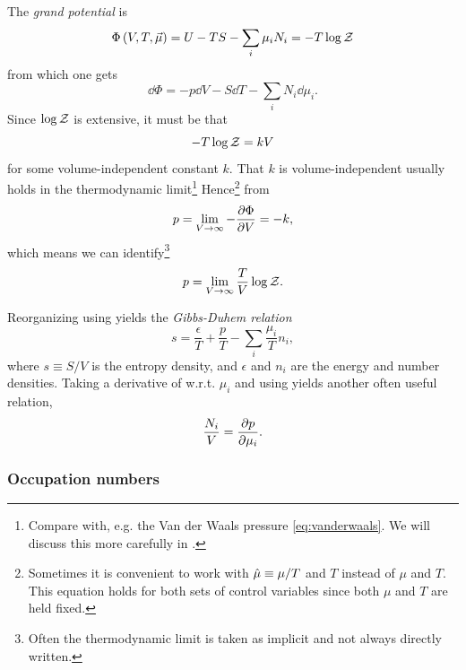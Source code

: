 The {\it grand potential} is
\begin{equation}\label{eq:grand}
  \Phi\left(V,T,\vec{\mu}\right)=U-TS-\sum_i\mu_i N_i=-T\log\mathcal{Z}
\end{equation}
from which one gets
\begin{equation}\label{eq:1stlawgrand}
  \dd\Phi=-p\dd{V}-S\dd{T}-\sum_i N_i\dd\mu_i.
\end{equation}
Since $\log\mathcal{Z}$ is extensive, it must be that
\begin{equation}
-T\log\mathcal{Z}=kV
\end{equation}
for some volume-independent constant $k$. That $k$ is volume-independent usually
holds in the thermodynamic limit\footnote{Compare with, e.g. the Van der
Waals pressure \eqref{eq:vanderwaals}. We will discuss this more carefully
in .} Hence\footnote{Sometimes it is convenient to work
with $\hat{\mu}\equiv\mu/T$ and $T$ instead of $\mu$ and $T$. This equation
holds for both sets of control variables since both $\mu$ and $T$ are
held fixed.} from 
\begin{equation}
p=\lim_{V\to\infty}-\pdv{\Phi}{V}=-k,
\end{equation}
which means we can identify\footnote{Often the thermodynamic limit is taken as
implicit and not always directly written.}
\begin{equation}\label{eq:pgrand}
p=\lim_{V\to\infty}\frac{T}{V}\log\mathcal{Z}.
\end{equation}

Reorganizing  using 
yields the {\it Gibbs-Duhem relation}
\begin{equation}
  s=\frac{\epsilon}{T}+\frac{p}{T}-\sum_i\frac{\mu_i}{T}n_i,
\end{equation}
where $s\equiv S/V$ is the entropy density, and $\epsilon$ and $n_i$
are the energy and number densities.
Taking a derivative of  w.r.t. $\mu_i$ and
using  yields
another often useful relation,
\begin{equation}
  \frac{N_i}{V}=\pdv{p}{\mu_i}.
\end{equation}

\subsubsection{Occupation numbers}

